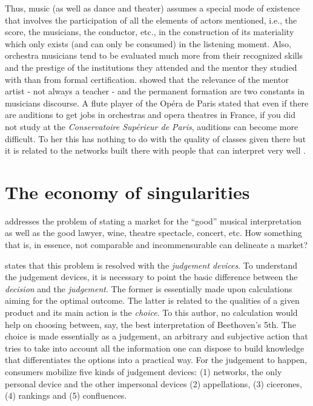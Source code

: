 \documentclass[a4paper, 12pt, openright, oneside, german, french, brazil, english]{abntex2}
\begin{document}
	Thus, music (as well as dance and theater) assumes a special mode of existence that involves the participation of all the elements of actors mentioned, i.e., the score, the musicians, the conductor, etc., in the construction of its materiality which only exists (and can only be consumed) in the listening moment. Also, orchestra musicians tend to be evaluated much more from their recognized skills and the prestige of the institutions they attended and the mentor they studied with than from formal certification.  showed that the relevance of the mentor artist -  not always a teacher - and the permanent formation are two constants in musicians discourse. A flute player of the Opéra de Paris stated that even if there are auditions to get jobs in orchestras and opera theatres in France, if you did not study at the \textit{Conservatoire Supérieur de Paris}, auditions can become more difficult. To her this has nothing to do with the quality of classes given there but it is related to the networks built there with people that can interpret very well \cite[p. 1]{segnini2013formaccao}.


        \section{The economy of singularities}
        
         addresses the problem of stating a market for the ``good'' musical interpretation as well as the good lawyer, wine, theatre spectacle, concert, etc. How something that is, in essence, not comparable and incommensurable can delineate a market?

         states that this problem is resolved with the \textit{judgement devices}. To understand the judgement devices, it is necessary to point the basic difference between the \textit{decision} and the \textit{judgement}. The former is essentially made upon calculations aiming for the optimal outcome. The latter is related to the qualities of a given product and its main action is the \textit{choice}. To this author, no calculation would help on choosing between, say, the best interpretation of Beethoven's 5th. The choice is made essentially as a judgement, an arbitrary and subjective action that tries to take into account all the information one can dispose to build knowledge that differentiates the options into a practical way. For the judgement to happen, consumers mobilize five kinds of judgement devices: (1) networks, the only personal device and the other impersonal devices  (2) appellations, (3) cicerones, (4) rankings and (5) confluences.
\end{document}
